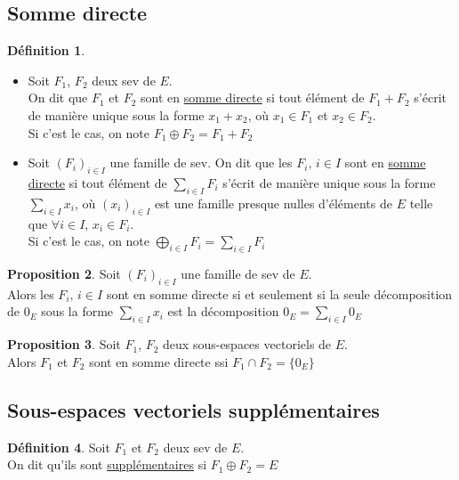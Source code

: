 \documentclass[10pt,a4paper]{article}
\theoremstyle{definition}
\newtheorem{proposition}{Proposition}[section]
\newtheorem{definition}[proposition]{Définition}
\begin{document}
\subsection{Somme directe}
\begin{definition}
\hfill
\begin{itemize}
\item Soit $F_1$, $F_2$ deux sev de $E$. \\
On dit que $F_1$ et $F_2$ sont en \uline{somme directe} si tout élément de $F_1 + F_2$ s'écrit de manière unique sous la forme $x_1 + x_2$, où $x_1 \in F_1$ et $x_2 \in F_2$. \\
Si c'est le cas, on note $F_1 \oplus F_2 = F_1 + F_2$
\item Soit $(F_i)_{i \in I}$ une famille de sev. On dit que les $F_i,\, i \in I$ sont en \uline{somme directe} si tout élément de $\sum\limits_{i \in I} F_i$ s'écrit de manière unique sous la forme $\sum\limits_{i \in I} x_i$, où $(x_i)_{i \in I}$ est une famille presque nulles d'éléments de $E$ telle que $\forall i \in I$, $x_i \in F_i$. \\
Si c'est le cas, on note $\bigoplus\limits_{i \in I} F_i = \sum\limits_{i \in I} F_i$
\end{itemize}
\end{definition}
\begin{proposition}
Soit $(F_i)_{i \in I}$ une famille de sev de $E$. \\
Alors les $F_i,\, i \in I$ sont en somme directe si et seulement si la seule décomposition de $0_E$ sous la forme $\sum\limits_{i \in I} x_i$ est la décomposition $0_E = \sum\limits_{i \in I} 0_E$
\end{proposition}
\begin{proposition}
Soit $F_1$, $F_2$ deux sous-espaces vectoriels de $E$. \\
Alors $F_1$ et $F_2$ sont en somme directe ssi $F_1 \cap F_2 = \{ 0_E \}$
\end{proposition}

\subsection{Sous-espaces vectoriels supplémentaires}
\begin{definition}
Soit $F_1$ et $F_2$ deux sev de $E$. \\
On dit qu'ils sont \uline{supplémentaires} si $F_1 \oplus F_2 = E$
\end{definition}
\end{document}
